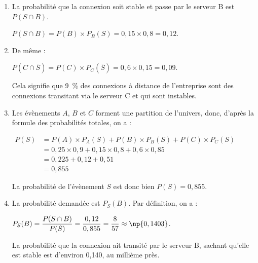 \begin{enumerate}
-%
%
%

\item La probabilité que la connexion soit stable et passe par le serveur B est $P(S \cap B)$.

$P(S \cap B) = P(B) \times P_B(S) = 0,15 \times 0,8 = 0,12$.

\item De même :

$P\left(C \cap \overline{S}\right) = P(C) \times P_C\left(\overline{S}\right) = 0,6 \times 0,15 = 0,09$.

Cela signifie que 9~\% des connexions à distance de l'entreprise sont des connexions transitant via le serveur C et qui sont instables.

\item Les évènements $A$, $B$ et $C$ forment une partition de l'univers, donc, d'après la formule des probabilités totales, on a :

$\begin{aligned}
P(S) &= P(A) \times P_A(S)+ P(B) \times P_B(S) + P(C) \times P_C(S)\\
&= 0,25 \times 0,9 + 0,15 \times 0,8 + 0,6 \times 0,85 \\
&= 0,225 + 0,12 + 0,51\\
&= 0,855
\end{aligned}$

La probabilité de l'évènement $S$ est donc bien $P(S)=0,855$.

\item La probabilité demandée est $P_S(B)$.
Par définition, on a :

$P_S(B) = \dfrac{P(S\cap B)}{P(S)} = \dfrac{0,12}{0,855} = \dfrac{8}{57}\approx \np{0,1403}$.

La probabilité que la connexion ait transité par le serveur B, sachant qu'elle est stable est d'environ 0,140, au millième près.
\end{enumerate}


